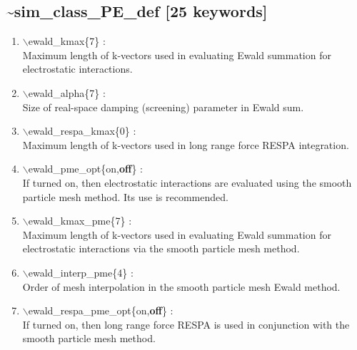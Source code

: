 \documentclass[12pt,titlepage]{article}
\begin{document}
\newpage
\subsection*{\bf \~{}sim\_class\_PE\_def [25 keywords]}

\begin{enumerate}

 \vspace{0.15in} 
 \item   $\backslash$ewald\_kmax\{7\} : \\
  Maximum length of k-vectors used in evaluating Ewald summation for 
  electrostatic interactions.

 \vspace{0.15in} 
 \item   $\backslash$ewald\_alpha\{7\} : \\
  Size of real-space damping (screening) parameter in Ewald sum.

 \vspace{0.15in} 
 \item   $\backslash$ewald\_respa\_kmax\{0\} : \\
   Maximum length of k-vectors used in long range force RESPA integration.

 \vspace{0.15in}
 \item   $\backslash$ewald\_pme\_opt\{on,{\bf off}\} : \\
  If turned on, then electrostatic interactions are evaluated using the
  smooth particle mesh method.  Its use is recommended.

 \vspace{0.15in} 
 \item   $\backslash$ewald\_kmax\_pme\{7\} : \\
  Maximum length of k-vectors used in evaluating Ewald summation for 
  electrostatic interactions via the smooth particle mesh method.

 \vspace{0.15in} 
 \item   $\backslash$ewald\_interp\_pme\{4\} : \\
   Order of mesh interpolation in the smooth particle mesh Ewald method.

 \vspace{0.15in} 
 \item   $\backslash$ewald\_respa\_pme\_opt\{on,{\bf off}\} : \\
  If turned on, then long range force RESPA is used in conjunction with the
  smooth particle mesh method.


\end{enumerate}
\end{document}
